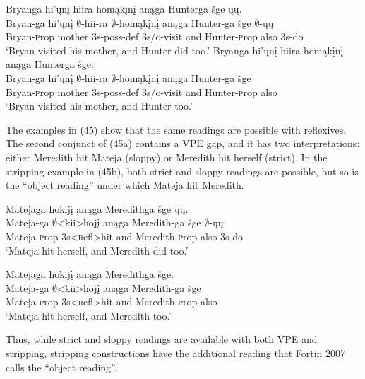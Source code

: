 \documentclass[output=paper]{LSP/langsci}
\begin{document}
\begin{exe}
\ex
\begin{xlist}
\ex
\glll Bryanga hi'ųnį hiira homąkįnį anąga Hunterga šge ųų.\\
Bryan-ga hi'ųnį $\emptyset$-hii-ra $\emptyset$-homąkįnį anąga Hunter-ga šge $\emptyset$-ųų\\
Bryan-{\textsc prop} mother {\textsc 3s-poss-def} {\textsc 3s/o}-visit and Hunter-{\textsc prop} also {\textsc 3s}-do\\
\trans `Bryan visited his mother, and Hunter did too.'
\ex
\glll Bryanga hi'ųnį hiira homąkįnį anąga Hunterga šge.\\
Bryan-ga hi'ųnį $\emptyset$-hii-ra $\emptyset$-homąkįnį anąga Hunter-ga šge\\
Bryan-{\textsc prop} mother {\textsc 3s-poss-def} {\textsc 3s/o}-visit and Hunter-{\textsc prop} also\\
\trans `Bryan visited his mother, and Hunter too.'
\end{xlist}
\end{exe}

The examples in (45) show that the same readings are possible with reflexives. The second conjunct of (45a) contains a VPE gap, and it has two interpretations: either Meredith hit Mateja (sloppy) or Meredith hit herself (strict). In the stripping example in (45b), both strict and sloppy readings are possible, but so is the ``object reading'' under which Mateja hit Meredith.

\begin{exe}
\ex
\begin{xlist}
\ex
\glll Matejaga hokijį anąga Meredithga šge ųų.\\
Mateja-ga $\emptyset$<kii>hojį anąga Meredith-ga šge $\emptyset$-ųų\\
Mateja-{\textsc prop} {\textsc 3s}<{\textsc refl}>hit and Meredith-{\textsc prop} also {\textsc 3s}-do\\
\trans `Mateja hit herself, and Meredith did too.'

\ex
\glll Matejaga hokijį anąga Meredithga šge.\\
Mateja-ga $\emptyset$<kii>hojį anąga Meredith-ga šge\\ 
Mateja-{\textsc prop} {\textsc 3s}<{\textsc refl}>hit and Meredith-{\textsc prop} also\\ 
\trans `Mateja hit herself, and Meredith too.'
\end{xlist}
\end{exe}

Thus, while strict and sloppy readings are available with both VPE and stripping, stripping constructions have the additional reading that Fortin 2007 calls the ``object reading''.
\end{document}

